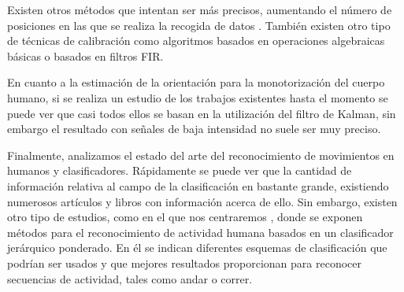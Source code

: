 Existen otros métodos que intentan ser más precisos, aumentando el número de posiciones en las que se realiza la recogida de datos \cite{Camps2009}. También existen otro tipo de técnicas de calibración como algoritmos basados en operaciones algebraicas básicas o basados en filtros FIR. \cite{A.Olivares2013}

En cuanto a la estimación de la orientación para la monotorización del cuerpo humano, si se realiza un estudio de los trabajos existentes hasta el momento se puede ver que casi todos ellos se basan en la utilización del filtro de Kalman, sin embargo el resultado con señales de baja intensidad no suele ser muy preciso.\cite{A.Olivares2013}

Finalmente, analizamos el estado del arte del reconocimiento de movimientos en humanos y clasificadores. Rápidamente se puede ver que la cantidad de información relativa al campo de la clasificación en bastante grande, existiendo numerosos artículos y libros con información acerca de ello. Sin embargo, existen otro tipo de estudios, como en el que nos centraremos \cite{Banos2012}, donde se exponen métodos para el reconocimiento de actividad humana basados en un clasificador jerárquico ponderado. En él se indican diferentes esquemas de clasificación que podrían ser usados y que mejores resultados proporcionan para reconocer secuencias de actividad, tales como andar o correr.

